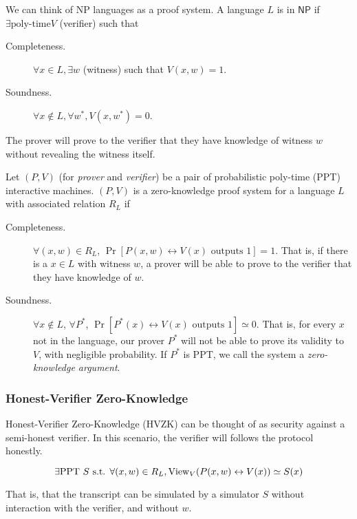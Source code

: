 We can think of NP languages as a proof system. A language $L$ is in $\mathsf{NP}$ if $\exists \text{poly-time} V$ (verifier) such that
\begin{description}
    \item[Completeness.] $\forall x\in L, \exists w$ (witness) such that $V(x, w) = 1$.
    \item[Soundness.] $\forall x\not\in L, \forall w^*, V(x, w^*) = 0$.
\end{description}
The prover will prove to the verifier that they have knowledge of witness $w$ without revealing the witness itself.

\begin{definition}
    Let $(P, V)$ (for \emph{prover} and \emph{verifier}) be a pair of probabilistic poly-time (PPT) interactive machines. $(P, V)$ is a zero-knowledge proof system for a language $L$ with associated relation $R_L$ if
    \begin{description}
        \item[Completeness.] $\forall (x, w)\in R_L$, $\Pr[P(x, w) \leftrightarrow V(x) \text{ outputs }1] = 1$. That is, if there is a $x\in L$ with witness $w$, a prover will be able to prove to the verifier that they have knowledge of $w$.
        \item[Soundness.] $\forall x\not\in L$, $\forall P^*$, $\Pr[P^*(x) \leftrightarrow V(x)\text{ outputs }1]\simeq 0$. That is, for every $x$ not in the language, our prover $P^*$ will not be able to prove its validity to $V$, with negligible probability. If $P^*$ is PPT, we call the system a \emph{zero-knowledge argument}.
    \end{description}

\end{definition}

\subsubsection{Honest-Verifier Zero-Knowledge}
Honest-Verifier Zero-Knowledge (HVZK) can be thought of as security against a semi-honest verifier. In this scenario, the verifier will follows the protocol honestly.

\[\exists\mathrm{PPT}\ S\text{ s.t. }\forall(x, w)\in R_L, \mathrm{View}_V(P(x, w)\leftrightarrow V(x))\simeq S(x)\]

That is, that the transcript can be simulated by a simulator $S$ without interaction with the verifier, and without $w$.

